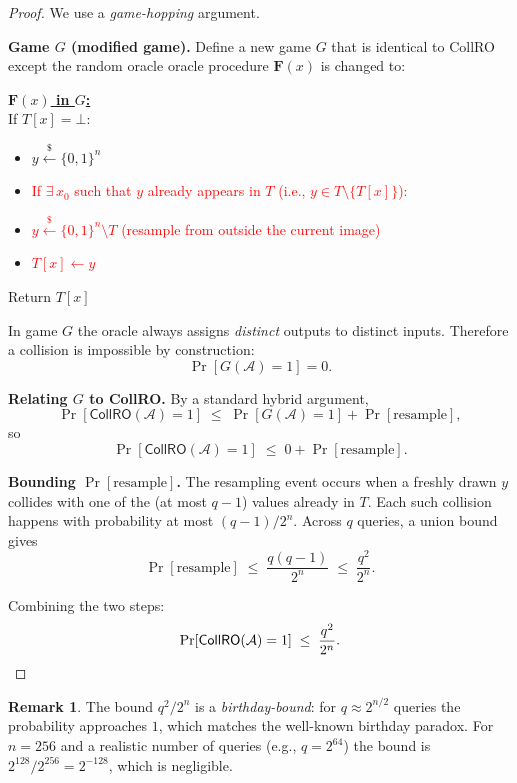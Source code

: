 \documentclass[11pt]{article}
\theoremstyle{plain}
\theoremstyle{definition}
\newtheorem{remark}[theorem]{Remark}
\newcommand{\samplefrom}{\xleftarrow{\$}}
\newcommand{\Adv}{\mathcal{A}}
\newcommand{\RO}{\mathbf{F}}   %
\begin{document}
\begin{proof}
We use a \emph{game-hopping} argument.

\medskip
\noindent\textbf{Game $G$ (modified game).}
Define a new game $G$ that is identical to \textsf{CollRO} except the random
oracle oracle procedure $\RO(x)$ is changed to:

\begin{tcolorbox}[colback=gray!8, colframe=gray!50]
\textbf{\underline{$\RO(x)$ in $G$:}}\\
If $T[x] = \bot$:
\begin{itemize}[leftmargin=2em, topsep=2pt, itemsep=0pt]
  \item $y \samplefrom \{0,1\}^n$
  \item \textcolor{red}{If $\exists\, x_0$ such that $y$ already appears in
        $T$ (i.e., $y \in T \setminus \{T[x]\}$):}
  \item \textcolor{red}{\quad $y \samplefrom \{0,1\}^n \setminus T$ \quad
        (resample from outside the current image)}
  \item \textcolor{red}{\quad $T[x] \leftarrow y$}
\end{itemize}
Return $T[x]$
\end{tcolorbox}

\noindent In game $G$ the oracle always assigns \emph{distinct} outputs to
distinct inputs. Therefore a collision is impossible by construction:
\[
  \Pr[G(\Adv) = 1] = 0.
\]

\noindent\textbf{Relating $G$ to \textsf{CollRO}.}
By a standard hybrid argument,
\[
  \Pr[\textsf{CollRO}(\Adv) = 1]
  \;\le\;
  \Pr[G(\Adv) = 1] + \Pr[\text{resample}],
\]
so
\[
  \Pr[\textsf{CollRO}(\Adv) = 1] \;\le\; 0 + \Pr[\text{resample}].
\]

\noindent\textbf{Bounding $\Pr[\text{resample}]$.}
The resampling event occurs when a freshly drawn $y$ collides with one of the
(at most $q-1$) values already in $T$.  Each such collision happens with
probability at most $(q-1)/2^n$.  Across $q$ queries, a union bound gives
\[
  \Pr[\text{resample}] \;\le\; \frac{q(q-1)}{2^n} \;\le\; \frac{q^2}{2^n}.
\]

\noindent Combining the two steps:
\[
  \Pr[\textsf{CollRO}(\Adv) = 1]
  \;\le\;
  \frac{q^2}{2^n}. \qedhere
\]
\end{proof}

\begin{remark}
The bound $q^2/2^n$ is a \emph{birthday-bound}: for $q \approx 2^{n/2}$
queries the probability approaches $1$, which matches the well-known birthday
paradox.  For $n = 256$ and a realistic number of queries (e.g., $q = 2^{64}$)
the bound is $2^{128}/2^{256} = 2^{-128}$, which is negligible.
\end{remark}
\end{document}
